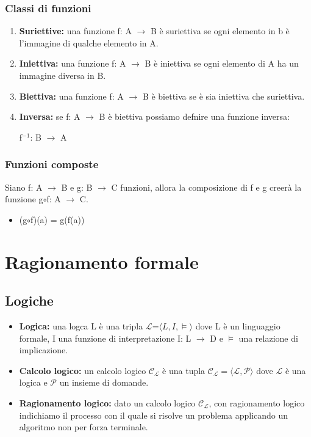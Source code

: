 \documentclass[../main.tex]{subfiles}
\begin{document}
    \subsection{Classi di funzioni}
    \begin{enumerate}
        \item \textbf{Suriettive:} una funzione f: A $\to$ B è suriettiva se ogni elemento in b è l'immagine di qualche elemento in A.
        \item \textbf{Iniettiva:} una funzione f: A $\to$ B è iniettiva se ogni elemento di A ha un immagine diversa in B.
        \item \textbf{Biettiva:} una funzione f: A $\to$ B è biettiva se è sia iniettiva che suriettiva.
        \item \textbf{Inversa:} se f: A $\to$ B è biettiva possiamo defnire una funzione inversa:
            \begin{center}
                f$^{-1}$: B $\to$ A
            \end{center}
    \end{enumerate}

    \subsection{Funzioni composte}
    Siano f: A $\to$ B e g: B $\to$ C funzioni, allora la composizione di f e g creerà la funzione g$\circ$f: A $\to$ C.
    \begin{itemize}
        \item (g$\circ$f)(a) = g(f(a))
    \end{itemize}

    \chapter{Ragionamento formale}
    \section{Logiche}
    \begin{itemize}
        \item \textbf{Logica:} una logca L è una tripla $\mathcal{L}$=$\langle L, I, \models \rangle$ dove L è un linguaggio formale, I una funzione di interpretazione I: L $\to$ D e $\models$ una relazione di implicazione.
        \item \textbf{Calcolo logico:} un calcolo logico $\mathcal{C}_\mathcal{L}$ è una tupla $\mathcal{C}_\mathcal{L} = \langle \mathcal{L}, \mathcal{P} \rangle$ dove $\mathcal{L}$ è una logica e $\mathcal{P}$ un insieme di domande.
        \item \textbf{Ragionamento logico:} dato un calcolo logico $\mathcal{C}_\mathcal{L}$, con ragionamento logico indichiamo il processo con il quale si risolve un problema applicando un algoritmo non per forza terminale.
    \end{itemize}
\end{document}
